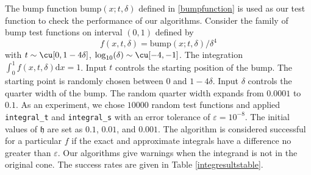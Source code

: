 \documentclass{iitthesis}
\DeclareMathOperator{\Var}{Var}
\theoremstyle{definition}
\theoremstyle{remark}
\begin{document}
The bump function $\text{bump}(x;t,\delta)$ defined in \eqref{bumpfunction} is used as our test function to check the performance of our algorithms. Consider the family of bump test functions on interval $(0,1)$ defined by
\begin{equation}\label{testfun}
f(x,t,\delta)= \text{bump}(x;t,\delta)/\delta^{4}
\end{equation}
with  $t \sim \cu[0,1-4\delta]$, $\log_{10}(\delta) \sim \cu[-4,-1]$. The integration $\int_{0}^{1}f(x,t,\delta)\text{d}x=1$. Input $t$ controls the starting position of the bump. The starting point is randomly chosen between $0$ and $1-4\delta$. Input $\delta$ controls the quarter width of the bump. The random quarter width expands from $0.0001$ to $0.1$.
As an experiment, we chose $10000$ random test functions and applied {\tt integral\_t} and {\tt integral\_s} with an error tolerance of  $\varepsilon = 10^{-8}$. The initial values of $\mathfrak{h}$ are set as $0.1$, $0.01$, and $0.001$. The algorithm is considered successful for a particular $f$ if the exact and approximate integrals have a difference no greater than $\varepsilon$. Our algorithms give warnings when the integrand is not in the original cone. The success rates are given in Table \ref{integresultstable}. %
\end{document}
